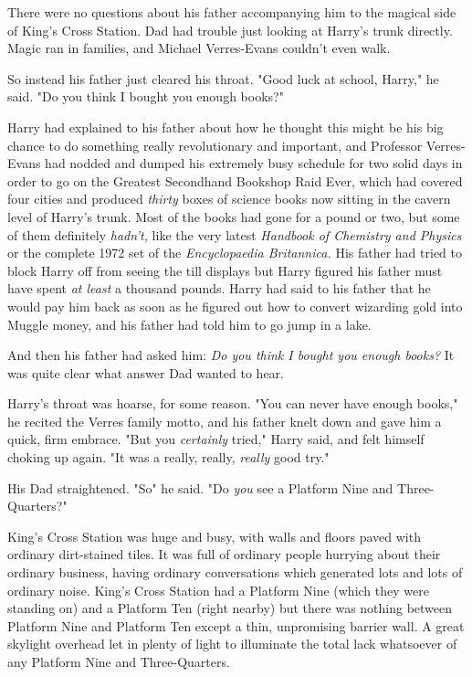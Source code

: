 There were no questions about his father accompanying him to the magical side
of King's Cross Station. Dad had trouble just looking at Harry's trunk
directly. Magic ran in families, and Michael Verres-Evans couldn't even walk.

So instead his father just cleared his throat. "Good luck at school, Harry," he
said. "Do you think I bought you enough books?"

Harry had explained to his father about how he thought this might be his big
chance to do something really revolutionary and important, and Professor
Verres-Evans had nodded and dumped his extremely busy schedule for two solid
days in order to go on the Greatest Secondhand Bookshop Raid Ever, which had
covered four cities and produced \emph{thirty} boxes of science books now
sitting in the cavern level of Harry's trunk. Most of the books had gone for a
pound or two, but some of them definitely \emph{hadn't,} like the very latest
\emph{Handbook of Chemistry and Physics} or the complete 1972 set of the
\emph{Encyclopaedia Britannica.} His father had tried to block Harry off from
seeing the till displays but Harry figured his father must have spent \emph{at
least} a thousand pounds. Harry had said to his father that he would pay him
back as soon as he figured out how to convert wizarding gold into Muggle money,
and his father had told him to go jump in a lake.

And then his father had asked him: \emph{Do you think I bought you enough
books?} It was quite clear what answer Dad wanted to hear.

Harry's throat was hoarse, for some reason. "You can never have enough books,"
he recited the Verres family motto, and his father knelt down and gave him a
quick, firm embrace. "But you \emph{certainly} tried," Harry said, and felt
himself choking up again. "It was a really, really, \emph{really} good try."

His Dad straightened. "So{\el}" he said. "Do \emph{you} see a Platform Nine
and Three-Quarters?"

King's Cross Station was huge and busy, with walls and floors paved with
ordinary dirt-stained tiles. It was full of ordinary people hurrying about
their ordinary business, having ordinary conversations which generated lots and
lots of ordinary noise. King's Cross Station had a Platform Nine (which they
were standing on) and a Platform Ten (right nearby) but there was nothing
between Platform Nine and Platform Ten except a thin, unpromising barrier wall.
A great skylight overhead let in plenty of light to illuminate the total lack
whatsoever of any Platform Nine and Three-Quarters.

